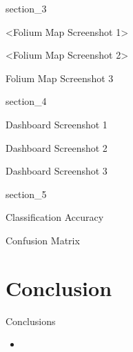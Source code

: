 {
{section_3}
\begin{frame}[plain]
\end{frame}
}

\begin{frame}{<Folium Map Screenshot 1>}

\end{frame}

\begin{frame}{<Folium Map Screenshot 2>}

\end{frame}

\begin{frame}{Folium Map Screenshot 3}

\end{frame}

{
{section_4}
\begin{frame}[plain]
\end{frame}
}

\begin{frame}{Dashboard Screenshot 1}

\end{frame}

\begin{frame}{Dashboard Screenshot 2}

\end{frame}

\begin{frame}{Dashboard Screenshot 3}

\end{frame}

{
{section_5}
\begin{frame}[plain]
\end{frame}
}

\begin{frame}{Classification Accuracy}

\end{frame}

\begin{frame}{Confusion Matrix}

\end{frame}

\section{Conclusion}

\begin{frame}{Conclusions}
    \begin{itemize}
        \item
    \end{itemize}
\end{frame}

